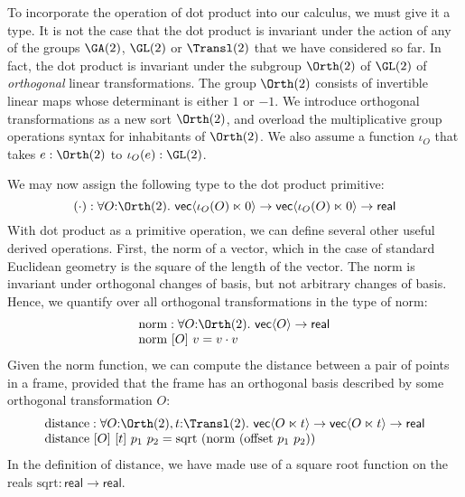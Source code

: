 To incorporate the operation of dot product into our calculus, we must
give it a type. It is not the case that the dot product is invariant
under the action of any of the groups $\GA(2)$, $\GL(2)$ or
$\Transl(2)$ that we have considered so far. In fact, the dot product
is invariant under the subgroup $\Orth(2)$ of $\GL(2)$ of
\emph{orthogonal} linear transformations. The group $\Orth(2)$
consists of invertible linear maps whose determinant is either $1$ or
$-1$. We introduce orthogonal transformations as a new sort
$\Orth(2)$, and overload the multiplicative group operations syntax
for inhabitants of $\Orth(2)$. We also assume a function $\iota_O$
that takes $e : \Orth(2)$ to $\iota_O(e) : \GL(2)$.

We may now assign the following type to the dot product primitive:
\begin{displaymath}
  (\cdot) : \forall O \mathord: \Orth(2).\ \mathsf{vec}\langle \iota_O(O) \ltimes 0 \rangle \to \mathsf{vec}\langle \iota_O(O) \ltimes 0 \rangle \to \mathsf{real}
\end{displaymath}
With dot product as a primitive operation, we can define several other
useful derived operations. First, the norm of a vector, which in the
case of standard Euclidean geometry is the square of the length of the
vector. The norm is invariant under orthogonal changes of basis, but
not arbitrary changes of basis. Hence, we quantify over all orthogonal
transformations in the type of $\mathrm{norm}$:
\begin{displaymath}
  \begin{array}{l}
    \mathrm{norm} : \forall O \mathord: \Orth(2).\ \mathsf{vec}\langle O \rangle \to \mathsf{real} \\
    \mathrm{norm}\ [O]\ v = v \cdot v
  \end{array}
\end{displaymath}
Given the norm function, we can compute the distance between a pair of
points in a frame, provided that the frame has an orthogonal basis
described by some orthogonal transformation $O$:
\begin{displaymath}
  \begin{array}{l}
    \mathrm{distance} : \forall O \mathord: \Orth(2), t \mathord: \Transl(2).\ \mathsf{vec}\langle O \ltimes t \rangle \to \mathsf{vec}\langle O \ltimes t \rangle \to \mathsf{real} \\
    \mathrm{distance}\ [O]\ [t]\ p_1\ p_2 = \mathrm{sqrt}\ (\mathrm{norm}\ (\mathrm{offset}\ p_1\ p_2))
  \end{array}
\end{displaymath}
In the definition of $\mathrm{distance}$, we have made use of a square
root function on the reals $\mathrm{sqrt} : \mathsf{real} \to
\mathsf{real}$.

